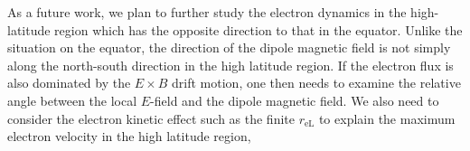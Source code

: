 \documentclass[draft,jgrga]{agutex2015}
\begin{document}
\begin{article}
As a future work, we plan to further study the %
electron dynamics in the high-latitude region which has the opposite direction to that in the equator.
Unlike the situation on the equator, the direction of the dipole magnetic field is not simply 
along the north-south direction in the high latitude region.  
If the electron flux is also dominated by the $E \times B$ drift motion, 
one then needs to examine the relative angle between
the local $E$-field and the dipole magnetic field.
We also need to consider the electron kinetic effect such as the finite 
$r_\mathrm{eL}$ to explain the maximum electron velocity in the high latitude region, 


%
%
%
%
%
%
%


\end{article}
\end{document}
